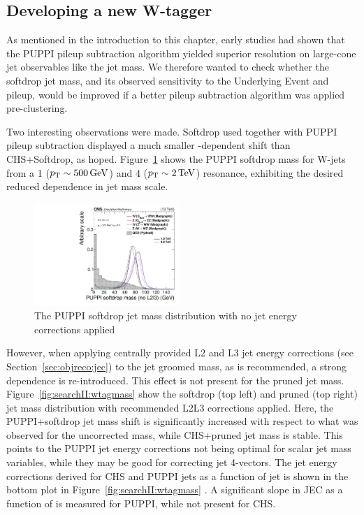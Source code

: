 \subsection{Developing a new W-tagger}
\label{sec:searchII:puppisoftdrop}
As mentioned in the introduction to this chapter, early studies had shown that the PUPPI pileup subtraction algorithm yielded superior resolution on large-cone jet observables like the jet mass. We therefore wanted to check whether the softdrop jet mass, and its observed sensitivity to the Underlying Event and pileup, would be improved if a better pileup subtraction algorithm was applied pre-clustering.\par
Two interesting observations were made. Softdrop used together with PUPPI pileup subtraction displayed a much smaller \PT-dependent shift than CHS+Softdrop, as hoped. Figure~\ref{fig:searchII:sdmass} shows the PUPPI softdrop mass for W-jets from a 1 \TeV ($p_{\mathrm{T}}\sim 500 \,\text{Ge\hspace{-.08em}V}$) and 4 \TeV ($p_{\mathrm{T}}\sim 2 \,\text{Te\hspace{-.08em}V}$) resonance, exhibiting the desired reduced \PT dependence in jet mass scale. 
\begin{figure}[htb]
\centering
\includegraphics[width=0.49\textwidth]{figures/analysis/search2/AN-16-235/plots/gen_SoftdropMassUnCorr.pdf}
\caption{The  PUPPI softdrop jet mass distribution with no jet energy corrections applied}
\label{fig:searchII:sdmass}
\end{figure}
However, when applying centrally provided L2 and L3 jet energy corrections (see Section~\ref{sec:objreco:jec}) to the jet groomed mass, as is recommended, a strong \PT dependence is re-introduced. This effect is not present for the pruned jet mass. Figure~\ref{fig:searchII:wtagmass} show the softdrop (top left) and pruned (top right) jet mass distribution with recommended L2L3 corrections applied. Here, the PUPPI+softdrop jet mass shift is significantly increased with respect to what was observed for the uncorrected mass, while CHS+pruned jet mass is stable. This points to the PUPPI jet energy corrections not being optimal for scalar jet mass variables, while they may be good for correcting jet 4-vectors. The jet energy corrections derived for CHS and PUPPI jets as a function of jet \PT is shown in the bottom plot in Figure~\ref{fig:searchII:wtagmass} . A significant slope in JEC as a function of \PT is measured for PUPPI, while not present for CHS.
